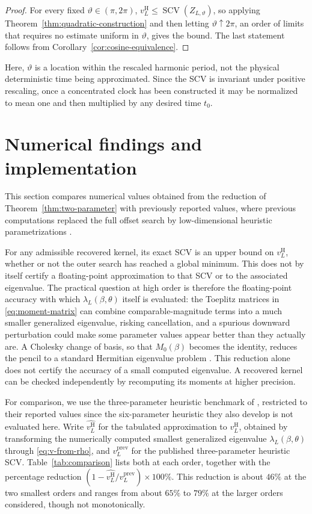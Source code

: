 \documentclass[11pt]{article}
\numberwithin{equation}{section}
\theoremstyle{remark}
\newcommand{\SCV}{\operatorname{SCV}}
\newcommand{\vH}{v^{\mathrm H}}
\begin{document}
\begin{proof}
For every fixed $\vartheta\in(\pi,2\pi)$, $\vH_L\leq\SCV(Z_{L,\vartheta})$, so applying Theorem~\ref{thm:quadratic-construction} and then letting $\vartheta\uparrow2\pi$, an order of limits that requires no estimate uniform in $\vartheta$, gives the bound. The last statement follows from Corollary~\ref{cor:cosine-equivalence}.
\end{proof}

Here, $\vartheta$ is a location within the rescaled harmonic period, not the physical deterministic time being approximated. Since the SCV is invariant under positive rescaling, once a concentrated clock has been constructed it may be normalized to mean one and then multiplied by any desired time $t_0$.

\section{Numerical findings and implementation}\label{sec:numerics}

This section compares numerical values obtained from the reduction of Theorem~\ref{thm:two-parameter} with previously reported values, where previous computations replaced the full offset search by low-dimensional heuristic parametrizations \citep{HorvathHorvathTelek2020,AlmousaTelek2021}.

For any admissible recovered kernel, its exact SCV is an upper bound on $\vH_L$, whether or not the outer search has reached a global minimum. This does not by itself certify a floating-point approximation to that SCV or to the associated eigenvalue. The practical question at high order is therefore the floating-point accuracy with which $\lambda_L(\beta,\theta)$ itself is evaluated: the Toeplitz matrices in \eqref{eq:moment-matrix} can combine comparable-magnitude terms into a much smaller generalized eigenvalue, risking cancellation, and a spurious downward perturbation could make some parameter values appear better than they actually are. A Cholesky change of basis, so that $M_0(\beta)$ becomes the identity, reduces the pencil to a standard Hermitian eigenvalue problem \citep[Table~2.13, case~1]{AndersonEtAl1999}. This reduction alone does not certify the accuracy of a small computed eigenvalue. A recovered kernel can be checked independently by recomputing its moments at higher precision.

For comparison, we use the three-parameter heuristic benchmark of \citet{AlmousaTelek2021}, restricted to their reported values since the six-parameter heuristic they also develop is not evaluated here. Write $\widehat{\vH_L}$ for the tabulated approximation to $\vH_L$, obtained by transforming the numerically computed smallest generalized eigenvalue $\lambda_L(\beta,\theta)$ through \eqref{eq:v-from-rho}, and $v_L^{\mathrm{prev}}$ for the published three-parameter heuristic SCV. Table~\ref{tab:comparison} lists both at each order, together with the percentage reduction $(1-\widehat{\vH_L}/v_L^{\mathrm{prev}})\times100\%$. This reduction is about $46\%$ at the two smallest orders and ranges from about $65\%$ to $79\%$ at the larger orders considered, though not monotonically.
\end{document}
